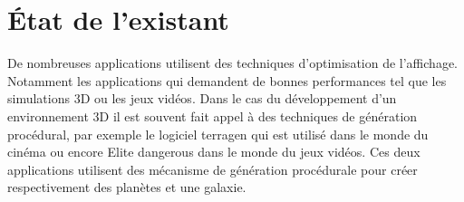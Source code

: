 \documentclass[12pt]{report}
\begin{document}
\newpage

\chapter*{État de l'existant}
\setcounter{chapter}{2}



De nombreuses applications utilisent des techniques d'optimisation de l'affichage. Notamment les applications qui demandent de bonnes performances tel que les simulations 3D ou les jeux vidéos.
Dans le cas du développement d'un environnement 3D il est souvent fait appel à des techniques de génération procédural, par exemple le logiciel terragen qui est utilisé dans le monde du cinéma ou encore Elite dangerous dans le monde du jeux vidéos.
Ces deux applications utilisent des mécanisme de génération procédurale pour créer respectivement des planètes et une galaxie.
\end{document}
